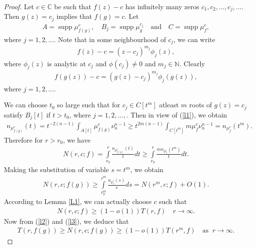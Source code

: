 \documentclass[11pt,reqno]{amsart}
\numberwithin{equation}{section}
\begin{document}
	\begin{proof}
	Let $c\in\mathbb{C}$ be such that $f(z)-c$ has infinitely many zeros $c_1,c_2,\ldots,c_j,\ldots$. Then $g(z)=c_j$ implies that $f(g)=c$. Let
	\begin{align*}
		A=\operatorname{supp} \mu^c_{f(g)},\quad B_j=\operatorname{supp} \mu^{c_j}_{g} \quad \text{and} \quad C=\operatorname{supp} \mu^c_f, 
	\end{align*}
	where $j=1,2,\ldots$. Note that in some neighbourhood of $c_j$, we can write 
	\begin{align*}
		f(z)-c=(z-c_j)^{m_j} \phi_j(z),
		\end{align*}
		where $\phi_j(z)$ is analytic at $c_j$ and $\phi(c_j)\neq 0$ and $m_j\in\mathbb{N}$. Clearly
		\begin{align}\label{l1}
			f(g(z))-c=(g(z)-c_j)^{m_j} \phi_j(g(z)),
		\end{align}
		where $j=1,2,\ldots$.
		
		We can choose $t_0$ so large such that for $c_j\in C[t^m]$ atleast $m$ roots of $g(z)=c_j$ satisfy $B_j\left\lbrack t\right\rbrack$
		if $t>t_0$, where $j=1,2,\ldots,$. Then in view of (\ref{l1}), we obtain
		\begin{align*}
			n_{\mu^c_{f(g)}}(t)=t^{-2(n-1)} \int_{A[t]}\mu^{c}_{f(g)}\nu_n^{n-1}\geq t^{2m(n-1)}\int_{C[t^m]}m\mu^c_f\nu_n^{n-1}=n_{\mu^c_f}(t^m).
		\end{align*}
		Therefore for $r>r_0$, we have 
		\begin{align*}
			N(r,c;f)=\int\limits^r_{r_0} \frac{n_{\mu^c_{f(g)}}(t)}{t} dt\geq \int\limits^r_{r_0}\frac{m n_{\mu^c_f}(t^m)}{t} dt.
		\end{align*}
		Making the substitution of variable $s=t^m$, we obtain
		\begin{align}\label{l2}
			N(r,c;f(g))\geq \int\limits_{r_0^m}^{r^m} \frac{n_{\mu^c_f}(s)}{s} ds=N(r^m,c;f)+O(1).
		\end{align}
		According to Lemma \ref{L1}, we can actually choose $c$ such that
		\begin{align}\label{l3}
			N(r,c;f)\geq (1-o(1)) T(r,f)\quad r\to \infty.
		\end{align}
		Now from (\ref{l2}) and (\ref{l3}), we deduce that
		\begin{align*}
			T(r,f(g))\geq N(r,c;f(g))\geq (1-o(1)) T\left(r^m,f\right)\quad \text{as}\;\; r\to \infty.
		\end{align*}
		
	\end{proof}
	
\end{document}
